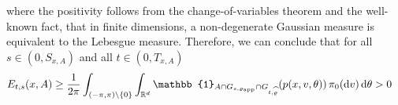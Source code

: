 \documentclass[sn-mathphys-num]{sn-jnl}%
\theoremstyle{thmstyleone}%
\theoremstyle{thmstyletwo}%
\theoremstyle{thmstylethree}%
\begin{document}
\begin{appendices}
\begin{enumerate}
    where the positivity follows from the change-of-variables theorem and the well-known fact, that in finite dimensions, a non-degenerate Gaussian measure is equivalent to the Lebesgue measure. Therefore, we can conclude that for all $s\in(0, S_{x,A})$ and all $t\in(0, T_{x,A})$
    \begin{align*}
        E_{t,s}(x,A)&\geq \frac{1}{2\pi}\int_{(-\pi,\pi)\setminus\{0\}} \int_{\mathbb R^d} \mathbb{1}_{A\cap G_{s,\varrho_{\textmd{app}}}\cap G_{t,\widehat{\varrho}}}(p(x,v,\theta)) \, \pi_0(\mathrm{d} v) \, \mathrm{d}\theta > 0 %
    \end{align*}


\end{enumerate}
\end{appendices}
\end{document}
